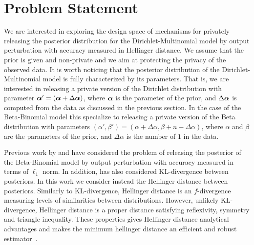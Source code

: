 \documentclass{article}
\begin{document}
\section{Problem Statement}
\label{subsec_problem}
We are interested in exploring the design space of mechanisms for privately releasing the posterior
distribution for the Dirichlet-Multinomial model by output
perturbation with accuracy measured in Hellinger distance. We assume
that the prior is given and non-private and we aim at protecting the
privacy of the observed data.
It is worth noticing that the posterior distribution of the Dirichlet-Multinomial model is fully characterized
by its parameters. That is, we are interested in releasing a private version of
the Dirichlet distribution with parameter
$\boldsymbol{\alpha}'=(\boldsymbol{\alpha} + \Delta \boldsymbol{\alpha})$, where $\boldsymbol{\alpha}$ is the
parameter of the prior, and $\Delta \boldsymbol{\alpha}$ is computed from the data
as discussed in the previous section. In the case of the
Beta-Binomial model this specialize to releasing a private version of the Beta distribution with 
parameters $(\alpha',\beta')=(\alpha + \Delta \alpha,\beta + n -
\Delta \alpha)$, where $\alpha$ and $\beta$ are the parameters of the
prior, and $\Delta \alpha$ is the number of $1$ in the data.


Previous work by \citet{zhang2016differential} and \citet{xiao2012bayesian}
have considered the problem of releasing the posterior of the
Beta-Binomial model by output perturbation with accuracy measured in terms of
$\ell_1$ norm. In addition,  \citet{zhang2016differential} has also
considered KL-divergence between posteriors. 
In this work we consider instead the Hellinger distance between
posteriors. Similarly to KL-divergence, Hellinger distance is an
$f$-divergence measuring levels of similarities between
distributions. However, unlikely KL-divergence, Hellinger distance is a proper
distance satisfying reflexivity, symmetry and triangle
inequality. These properties gives Hellinger distance analytical
advantages and makes the minimum hellinger distance  an efficient and
robust estimator~\cite{}.
\end{document}
